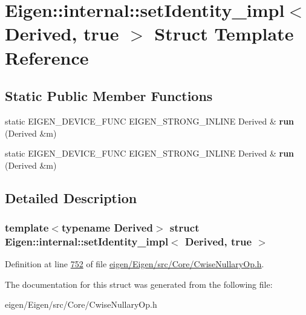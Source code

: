 \hypertarget{struct_eigen_1_1internal_1_1set_identity__impl_3_01_derived_00_01true_01_4}{}\section{Eigen\+:\+:internal\+:\+:set\+Identity\+\_\+impl$<$ Derived, true $>$ Struct Template Reference}
\label{struct_eigen_1_1internal_1_1set_identity__impl_3_01_derived_00_01true_01_4}
\subsection*{Static Public Member Functions}
\begin{DoxyCompactItemize}
\item 
\mbox{\label{struct_eigen_1_1internal_1_1set_identity__impl_3_01_derived_00_01true_01_4_a84de7f15ad1832d9c6b51b8f32e4c571}} 
static E\+I\+G\+E\+N\+\_\+\+D\+E\+V\+I\+C\+E\+\_\+\+F\+U\+NC E\+I\+G\+E\+N\+\_\+\+S\+T\+R\+O\+N\+G\+\_\+\+I\+N\+L\+I\+NE Derived \& {\bfseries run} (Derived \&m)
\item 
\mbox{\label{struct_eigen_1_1internal_1_1set_identity__impl_3_01_derived_00_01true_01_4_a84de7f15ad1832d9c6b51b8f32e4c571}} 
static E\+I\+G\+E\+N\+\_\+\+D\+E\+V\+I\+C\+E\+\_\+\+F\+U\+NC E\+I\+G\+E\+N\+\_\+\+S\+T\+R\+O\+N\+G\+\_\+\+I\+N\+L\+I\+NE Derived \& {\bfseries run} (Derived \&m)
\end{DoxyCompactItemize}


\subsection{Detailed Description}
\subsubsection*{template$<$typename Derived$>$\newline
struct Eigen\+::internal\+::set\+Identity\+\_\+impl$<$ Derived, true $>$}



Definition at line \hyperlink{eigen_2_eigen_2src_2_core_2_cwise_nullary_op_8h_source_l00752}{752} of file \hyperlink{eigen_2_eigen_2src_2_core_2_cwise_nullary_op_8h_source}{eigen/\+Eigen/src/\+Core/\+Cwise\+Nullary\+Op.\+h}.



The documentation for this struct was generated from the following file\+:\begin{DoxyCompactItemize}
\item 
eigen/\+Eigen/src/\+Core/\+Cwise\+Nullary\+Op.\+h\end{DoxyCompactItemize}
